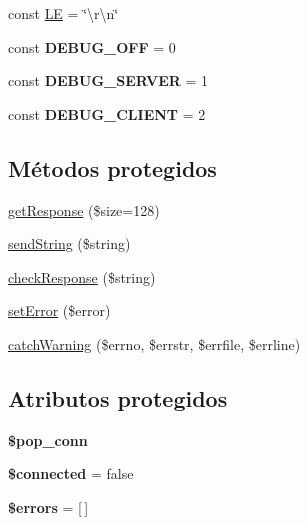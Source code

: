 \begin{DoxyCompactItemize}
const \hyperlink{classPHPMailer_1_1PHPMailer_1_1POP3_aa250448fdb8ba74ce6f6900878c090fa}{LE} = \char`\"{}\textbackslash{}r\textbackslash{}n\char`\"{}
\item 
\mbox{\label{classPHPMailer_1_1PHPMailer_1_1POP3_a72ebeefd63f5408d1ca2dccf4b2bdae2}} 
const {\bfseries D\+E\+B\+U\+G\+\_\+\+O\+FF} = 0
\item 
\mbox{\label{classPHPMailer_1_1PHPMailer_1_1POP3_a017aa1f975409e985225afc3004d646b}} 
const {\bfseries D\+E\+B\+U\+G\+\_\+\+S\+E\+R\+V\+ER} = 1
\item 
\mbox{\label{classPHPMailer_1_1PHPMailer_1_1POP3_a5e73f92b69db8dffe9ed6618ca936ca2}} 
const {\bfseries D\+E\+B\+U\+G\+\_\+\+C\+L\+I\+E\+NT} = 2
\end{DoxyCompactItemize}
\subsection*{Métodos protegidos}
\begin{DoxyCompactItemize}
\item 
\hyperlink{classPHPMailer_1_1PHPMailer_1_1POP3_a67a1f6155352068a4fbed66b782ff51f}{get\+Response} (\$size=128)
\item 
\hyperlink{classPHPMailer_1_1PHPMailer_1_1POP3_a54dbb2064a673ed77dd5800772245daf}{send\+String} (\$string)
\item 
\hyperlink{classPHPMailer_1_1PHPMailer_1_1POP3_ae4a9be487b6a6f56aee7e75d6904efbf}{check\+Response} (\$string)
\item 
\hyperlink{classPHPMailer_1_1PHPMailer_1_1POP3_aa49f9f98124005fcd158cda54e129e64}{set\+Error} (\$error)
\item 
\hyperlink{classPHPMailer_1_1PHPMailer_1_1POP3_a003cbe69ab2bec569f2f526f781a898f}{catch\+Warning} (\$errno, \$errstr, \$errfile, \$errline)
\end{DoxyCompactItemize}
\subsection*{Atributos protegidos}
\begin{DoxyCompactItemize}
\item 
\mbox{\label{classPHPMailer_1_1PHPMailer_1_1POP3_a10ba89166673bdcadbe60a3c55fd8f8e}} 
{\bfseries \$pop\+\_\+conn}
\item 
\mbox{\label{classPHPMailer_1_1PHPMailer_1_1POP3_a316daf1dd734a645f5e0fd87a5fe5eb9}} 
{\bfseries \$connected} = false
\item 
\mbox{\label{classPHPMailer_1_1PHPMailer_1_1POP3_a82e89b1a2bd2aaeeee1b839fc56d8a96}} 
{\bfseries \$errors} = \mbox{[}$\,$\mbox{]}
\end{DoxyCompactItemize}


